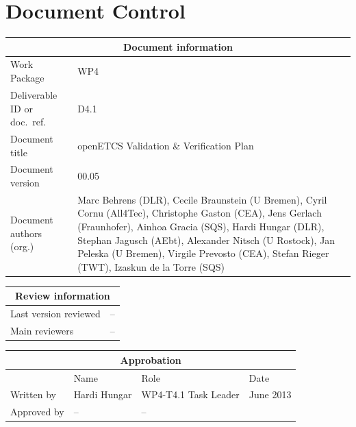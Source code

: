 \documentclass{template/openetcs_report}
\begin{document}
\maketitle
\tableofcontents
\listoffiguresandtables
\newpage

\chapter{Document Control}

\begin{tabular}{|p{4.4cm}|p{8.7cm}|}
  \hline
  \multicolumn{2}{|c|}{Document information} \\
  \hline
  Work Package &  WP4  \\
  Deliverable ID or doc.\ ref.\ & D4.1\\
  \hline
  Document title & openETCS Validation \& Verification Plan\\
  Document version & 00.05 \\
  Document authors (org.)  &  Marc Behrens (DLR),
  Cecile Braunstein (U Bremen), Cyril Cornu (All4Tec), Christophe
  Gaston (CEA), Jens Gerlach 
  (Fraunhofer), Ainhoa Gracia (SQS), Hardi Hungar (DLR), Stephan Jagusch
  (AEbt), Alexander Nitsch (U Rostock), Jan Peleska (U Bremen),
  Virgile Prevosto (CEA),
  Stefan Rieger (TWT), Izaskun de la Torre (SQS)\\
  \hline
\end{tabular}

\begin{tabular}{|p{4.4cm}|p{8.7cm}|}
\hline
\multicolumn{2}{|c|}{Review information} \\
\hline
Last version reviewed & -- \\
\hline
Main reviewers & -- \\
\hline
\end{tabular}

\begin{tabular}{|p{2.2cm}|p{4cm}|p{4cm}|p{2cm}|}
\hline
\multicolumn{4}{|c|}{Approbation} \\
\hline
  &  Name & Role & Date   \\
\hline  
Written by    &  Hardi Hungar & WP4-T4.1 Task Leader  &  June 2013\\
\hline
Approved by & -- & -- & \\
\hline
\end{tabular}
\end{document}

